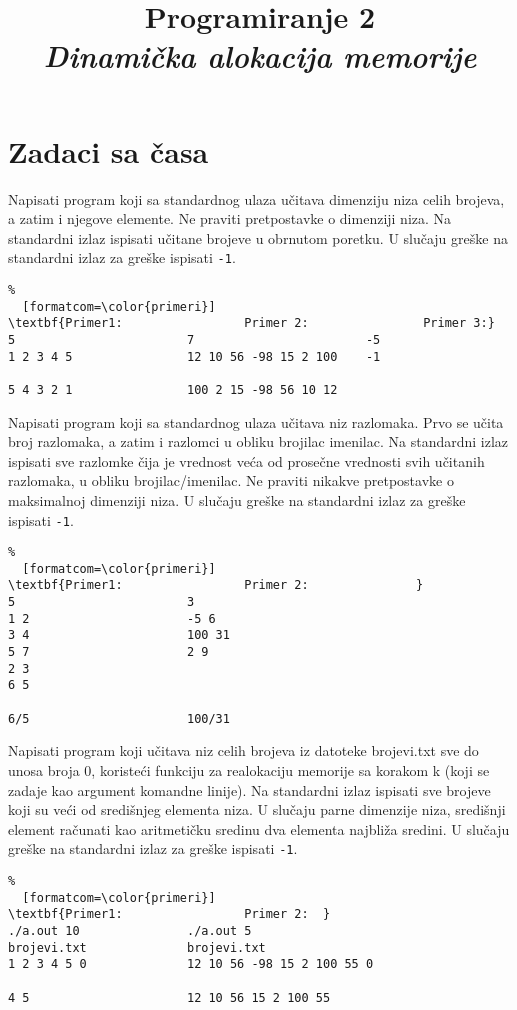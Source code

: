 \documentclass{article}
\title{{\bf Programiranje 2\\ \emph{Dinamička alokacija memorije}}}
\begin{document}
\maketitle

\section{Zadaci sa časa}

\begin{z}
Napisati program koji sa standardnog ulaza učitava dimenziju niza celih brojeva, a zatim i njegove
elemente. Ne praviti pretpostavke o dimenziji niza. Na standardni
izlaz ispisati učitane brojeve u obrnutom poretku.
U slučaju greške na standardni izlaz za greške ispisati {\tt -1}. 
\end{z}
\begin{Verbatim}%
  [formatcom=\color{primeri}]
\textbf{Primer1:                 Primer 2:                Primer 3:}
5                        7                        -5
1 2 3 4 5                12 10 56 -98 15 2 100    -1

5 4 3 2 1                100 2 15 -98 56 10 12
\end{Verbatim}

\begin{z}
Napisati program koji sa standardnog ulaza učitava niz razlomaka. Prvo se učita broj razlomaka,
a zatim i razlomci u obliku brojilac imenilac. Na standardni izlaz ispisati sve razlomke čija je vrednost veća od
prosečne vrednosti svih učitanih razlomaka, u obliku brojilac/imenilac. 
Ne praviti nikakve pretpostavke o maksimalnoj dimenziji niza. U slučaju greške na standardni izlaz za greške ispisati {\tt -1}. 
\end{z}
\begin{Verbatim}%
  [formatcom=\color{primeri}]
\textbf{Primer1:                 Primer 2:               }
5                        3
1 2                      -5 6
3 4                      100 31
5 7                      2 9
2 3
6 5

6/5                      100/31
\end{Verbatim}

\begin{z}
Napisati program koji učitava niz celih brojeva iz datoteke brojevi.txt  sve do unosa broja 0, koristeći funkciju za realokaciju memorije sa korakom k (koji se zadaje kao argument komandne linije). Na standardni izlaz ispisati sve brojeve koji su veći od središnjeg elementa niza. U slučaju parne dimenzije niza, središnji element računati kao aritmetičku sredinu dva elementa najbliža sredini. 
U slučaju greške na standardni izlaz za greške ispisati {\tt -1}. 
\end{z}
\begin{Verbatim}%
  [formatcom=\color{primeri}]
\textbf{Primer1:                 Primer 2:  }
./a.out 10               ./a.out 5
brojevi.txt              brojevi.txt                    
1 2 3 4 5 0              12 10 56 -98 15 2 100 55 0

4 5                      12 10 56 15 2 100 55
\end{Verbatim}
\end{document}
